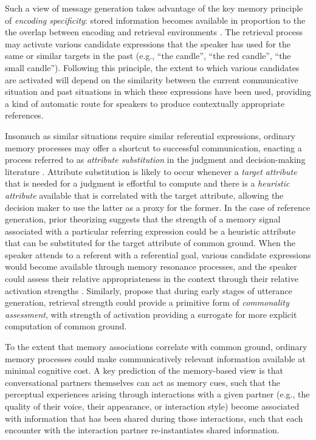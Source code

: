 \documentclass[natbib,man,a4paper]{apa6}
\begin{document}
Such a view of message generation takes advantage of the key memory principle of \emph{encoding specificity}: stored information becomes available in proportion to the the overlap between encoding and retrieval environments \citep{tulvingthomson73}.  The retrieval process may activate various candidate expressions that the speaker has used for the same or similar targets in the past (e.g., ``the candle'', ``the red candle'', ``the small candle'').  Following this principle, the extent to which various candidates are activated will depend on the similarity between the current communicative situation and past situations in which these expressions have been used, providing a kind of automatic route for speakers to produce contextually appropriate references. 

Insomuch as similar situations require similar referential expressions, ordinary memory processes may offer a shortcut to successful communication, enacting a process referred to as \emph{attribute substitution} in the judgment and decision-making literature \citep{KahnemanFrederick2002}.  Attribute substitution is likely to occur whenever a \emph{target attribute} that is needed for a judgment is effortful to compute and there is a \emph{heuristic attribute} available that is correlated with the target attribute, allowing the decision maker to use the latter as a proxy for the former.  In the case of reference generation, prior theorizing suggests that the strength of a memory signal associated with a particular referring expression could be a heuristic attribute that can be substituted for the target attribute of common ground.  When the speaker attends to a referent with a referential goal, various candidate expressions would become available through memory resonance processes, and the speaker could assess their relative appropriateness in the context through their relative activation strengths \citep{GannBarr2014}.  Similarly, \citet{horton_gerrig_2016} propose that during early stages of utterance generation, retrieval strength could provide a primitive form of \emph{commonality assessment}, with strength of activation providing a surrogate for more explicit computation of common ground.

To the extent that memory associations correlate with common ground, ordinary memory processes could make communicatively relevant information available at minimal cognitive cost.  A key prediction of the memory-based view is that conversational partners themselves can act as memory cues, such that the perceptual experiences arising through interactions with a given partner (e.g., the quality of their voice, their appearance, or interaction style) become associated with information that has been shared during those interactions, such that each encounter with the interaction partner re-instantiates shared information.
\end{document}

